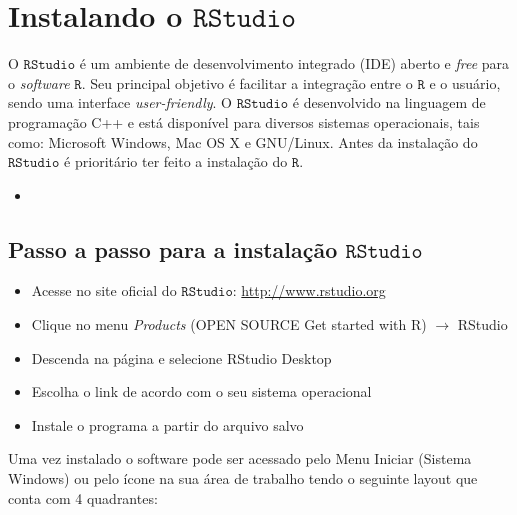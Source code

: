 \documentclass[
]{book}
\providecommand{\tightlist}{%
  \setlength{\itemsep}{0pt}\setlength{\parskip}{0pt}}
\begin{document}
\hypertarget{instalando-o-textttrstudio}{%
\section{\texorpdfstring{Instalando o \(\texttt{RStudio}\)}{Instalando o \textbackslash texttt\{RStudio\}}}\label{instalando-o-textttrstudio}}

O \(\texttt{RStudio}\) é um ambiente de desenvolvimento integrado (IDE) aberto e \emph{free} para o \emph{software} \(\texttt{R}\). Seu principal objetivo é facilitar a integração entre o \(\texttt{R}\) e o usuário, sendo uma interface \emph{user-friendly}. O \(\texttt{RStudio}\) é desenvolvido na linguagem de programação C++ e está disponível para diversos sistemas operacionais, tais como: Microsoft Windows, Mac OS X e GNU/Linux. Antes da instalação do \(\texttt{RStudio}\) é prioritário ter feito a instalação do \(\texttt{R}\).

\begin{itemize}
\tightlist
\item
\end{itemize}

\hypertarget{passo-a-passo-para-a-instalauxe7uxe3o-textttrstudio}{%
\subsection{\texorpdfstring{Passo a passo para a instalação \(\texttt{RStudio}\)}{Passo a passo para a instalação \textbackslash texttt\{RStudio\}}}\label{passo-a-passo-para-a-instalauxe7uxe3o-textttrstudio}}

\begin{itemize}
\item
  Acesse no site oficial do \(\texttt{RStudio}\): \url{http://www.rstudio.org}
\item
  Clique no menu \emph{Products} (OPEN SOURCE Get started with R) \(\rightarrow\) RStudio
\item
  Descenda na página e selecione RStudio Desktop
\item
  Escolha o link de acordo com o seu sistema operacional
\item
  Instale o programa a partir do arquivo salvo
\end{itemize}

Uma vez instalado o software pode ser acessado pelo Menu Iniciar (Sistema Windows) ou pelo ícone na sua área de trabalho tendo o seguinte layout que conta com 4 quadrantes:
\end{document}
